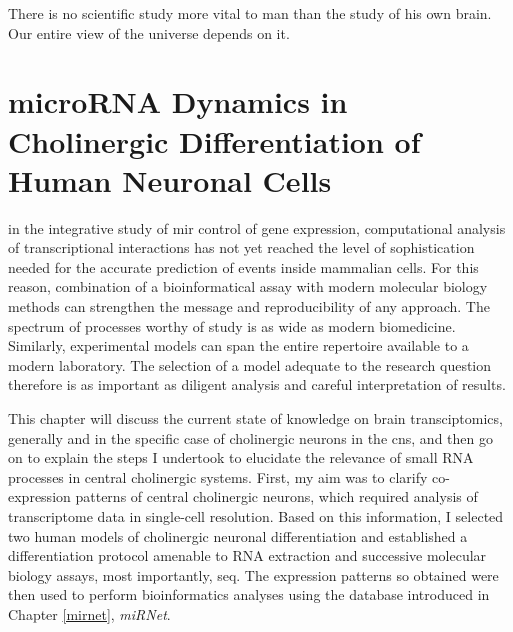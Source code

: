 \begin{savequote}[60mm]
There is no scientific study more vital to man than the study of his own brain. Our entire view of the universe depends on it.
\end{savequote}





\chapter{microRNA Dynamics in Cholinergic Differentiation of Human Neuronal Cells}

 in the integrative study of \ac{mir} control of gene expression, computational analysis of transcriptional interactions has not yet reached the level of sophistication needed for the accurate prediction of events inside mammalian cells. For this reason, combination of a bioinformatical assay with modern molecular biology methods can strengthen the message and reproducibility of any approach. The spectrum of processes worthy of study is as wide as modern biomedicine. Similarly, experimental models can span the entire repertoire available to a modern laboratory. The selection of a model adequate to the research question therefore is as important as diligent analysis and careful interpretation of results.

This chapter will discuss the current state of knowledge on brain transciptomics, generally and in the specific case of cholinergic neurons in the \ac{cns}, and then go on to explain the steps I undertook to elucidate the relevance of small RNA processes in central cholinergic systems. First, my aim was to clarify co-expression patterns of central cholinergic neurons, which required analysis of transcriptome data in single-cell resolution. Based on this information, I selected two human models of cholinergic neuronal differentiation and established a differentiation protocol amenable to RNA extraction and successive molecular biology assays, most importantly, \ac{seq}. The expression patterns so obtained were then used to perform bioinformatics analyses using the database introduced in Chapter \ref{mirnet}, \textit{miRNet}. 

